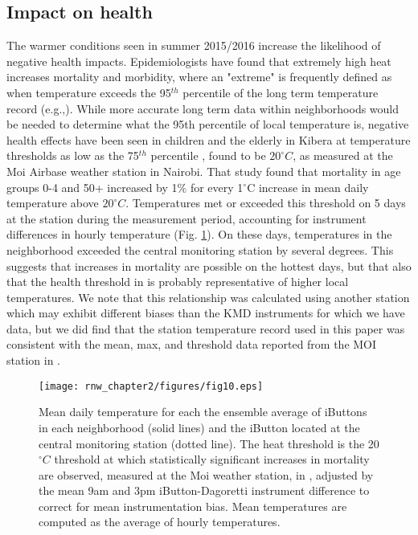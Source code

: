 \subsection{Impact on health}
The warmer conditions seen in summer 2015/2016 increase the likelihood of negative health impacts.
Epidemiologists have found that extremely high heat increases mortality and morbidity, where an "extreme" is frequently defined as when temperature exceeds the 95$^{th}$ percentile of the long term temperature record
 (e.g.,\cite{gasparrini2015mortality}).
While more accurate long term data within neighborhoods would be needed to determine what the 95th percentile of local temperature is, negative health effects have been seen in children and the elderly in Kibera at temperature thresholds as low as the 75$^{th}$ percentile \cite{egondi2012}, found to be $20 ^\circ C$, as measured at the Moi Airbase weather station in Nairobi. 
That study found that mortality in age groups 0-4 and 50+ increased by 1\% for every 1$^\circ $C increase in mean daily temperature above $20 ^\circ C$. 
Temperatures met or exceeded this threshold on 5 days at the station during the measurement period, accounting for instrument differences in hourly temperature (Fig. \ref{healthtimeseries}). On these days, temperatures in the neighborhood exceeded the central monitoring station by several degrees. 
This suggests that increases in mortality 
are possible on the hottest days, but that also that the health threshold in \cite{egondi2012} is probably representative of higher local temperatures. We note that this relationship was calculated using another station which may exhibit different biases than the KMD instruments for which we have data, but we did find that the station temperature record used in this paper was consistent with the mean, max, and threshold data reported from the MOI station in \cite{egondi2012}. 

\begin{figure}
\texttt{[image: rnw\_chapter2/figures/fig10.eps]}
\caption{%
Mean daily temperature for each the ensemble average of iButtons in each neighborhood (solid lines) and the iButton located at the central monitoring station (dotted line). The heat threshold is the 20$^\circ C$ threshold at which statistically significant increases in mortality are observed, measured at the Moi weather station, in \cite{egondi2012},  adjusted by the mean 9am and 3pm iButton-Dagoretti instrument difference to correct for mean instrumentation bias. Mean temperatures are computed as the average of hourly temperatures. } 
\label{healthtimeseries}
\end{figure}

